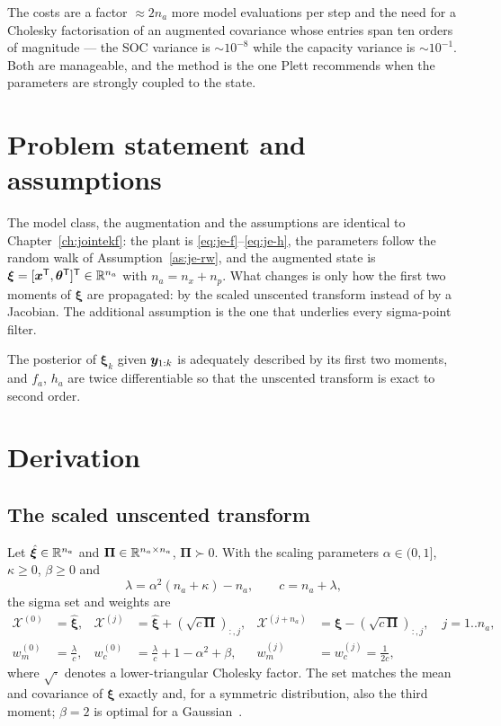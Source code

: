 The costs are a factor $\approx 2n_a$ more model evaluations per step and the need for a Cholesky
factorisation of an augmented covariance whose entries span ten orders of magnitude --- the SOC
variance is $\sim10^{-8}$ while the capacity variance is $\sim10^{-1}$.  Both are manageable, and
the method is the one Plett recommends when the parameters are strongly coupled to the state.

\section{Problem statement and assumptions}
The model class, the augmentation and the assumptions are identical to
Chapter~\ref{ch:jointekf}: the plant is \eqref{eq:je-f}--\eqref{eq:je-h}, the parameters follow the
random walk of Assumption~\ref{as:je-rw}, and the augmented state is
$\bm{\xi}=[\bm{x}^{\mathsf{T}},\bm{\theta}^{\mathsf{T}}]^{\mathsf{T}}\in\mathbb{R}^{n_a}$ with $n_a=n_x+n_p$.  What changes is only how the
first two moments of $\bm{\xi}$ are propagated: by the scaled unscented transform instead of by a
Jacobian.  The additional assumption is the one that underlies every sigma-point filter.

\begin{assumption}\label{as:ju-moments}
The posterior of $\bm{\xi}_k$ given $\bm{y}_{1:k}$ is adequately described by its first two moments,
and $f_a$, $h_a$ are twice differentiable so that the unscented transform is exact to second order.
\end{assumption}

\section{Derivation}

\subsection{The scaled unscented transform}
Let $\hat{\bm{\xi}}\in\mathbb{R}^{n_a}$ and $\bm{\Pi}\in\mathbb{R}^{n_a\times n_a}$, $\bm{\Pi}\succ0$.  With
the scaling parameters $\alpha\in(0,1]$, $\kappa\ge0$, $\beta\ge0$ and
\begin{equation}
\lambda=\alpha^2(n_a+\kappa)-n_a, \qquad c=n_a+\lambda,
\label{eq:ju-lambda}
\end{equation}
the sigma set and weights are
\begin{align}
\mathcal{X}^{(0)}&=\hat{\bm{\xi}}, &
\mathcal{X}^{(j)}&=\hat{\bm{\xi}}+\left(\sqrt{c\,\bm{\Pi}}\right)_{:,j}, &
\mathcal{X}^{(j+n_a)}&=\hat{\bm{\xi}}-\left(\sqrt{c\,\bm{\Pi}}\right)_{:,j}, \quad j=1..n_a,
\label{eq:ju-sigma}\\
w^{(0)}_m&=\frac{\lambda}{c}, &
w^{(0)}_c&=\frac{\lambda}{c}+1-\alpha^2+\beta, &
w^{(j)}_m&=w^{(j)}_c=\frac{1}{2c},
\label{eq:ju-weights}
\end{align}
where $\sqrt{\cdot}$ denotes a lower-triangular Cholesky factor.  The set matches the mean and
covariance of $\bm{\xi}$ exactly and, for a symmetric distribution, also the third moment; $\beta=2$
is optimal for a Gaussian~\cite{wan2000ukf}.

